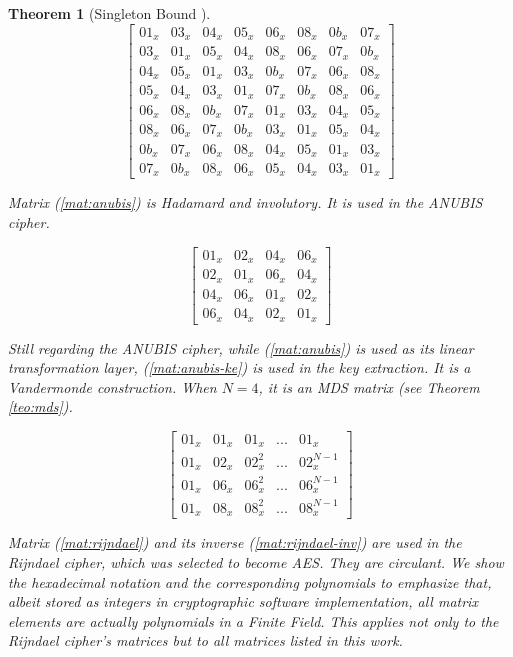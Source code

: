 \documentclass{report}
\newtheorem{theorem}{Theorem}{\bfseries}{\itshape}
\begin{document}
\begin{theorem}[Singleton Bound \cite{SloaneBook}]
\begin{equation}\label{mat:khazad}
\begin{bmatrix}
01_x & 03_x & 04_x & 05_x & 06_x & 08_x & 0b_x & 07_x\\
03_x & 01_x & 05_x & 04_x & 08_x & 06_x & 07_x & 0b_x\\
04_x & 05_x & 01_x & 03_x & 0b_x & 07_x & 06_x & 08_x\\
05_x & 04_x & 03_x & 01_x & 07_x & 0b_x & 08_x & 06_x\\
06_x & 08_x & 0b_x & 07_x & 01_x & 03_x & 04_x & 05_x\\
08_x & 06_x & 07_x & 0b_x & 03_x & 01_x & 05_x & 04_x\\
0b_x & 07_x & 06_x & 08_x & 04_x & 05_x & 01_x & 03_x\\
07_x & 0b_x & 08_x & 06_x & 05_x & 04_x & 03_x & 01_x
\end{bmatrix}
\end{equation}

Matrix (\ref{mat:anubis}) is Hadamard and involutory. It is used in the ANUBIS \cite{ANUBIS2000} cipher.

\begin{equation}\label{mat:anubis}
\begin{bmatrix}
01_x & 02_x & 04_x & 06_x\\
02_x & 01_x & 06_x & 04_x\\
04_x & 06_x & 01_x & 02_x\\
06_x & 04_x & 02_x & 01_x
\end{bmatrix}
\end{equation}

Still regarding the ANUBIS cipher, while (\ref{mat:anubis}) is used as its linear transformation layer, (\ref{mat:anubis-ke}) is used in the key extraction. It is a Vandermonde construction. When $N = 4$, it is an MDS matrix (see Theorem \ref{teo:mds}).

\begin{equation}\label{mat:anubis-ke}
\begin{bmatrix}
01_x & 01_x & 01_x & ... & 01_x\\
01_x & 02_x & 02_x^2 & ... & 02_x^{N-1}\\
01_x & 06_x & 06_x^2 & ... & 06_x^{N-1}\\
01_x & 08_x & 08_x^2 & ... & 08_x^{N-1}
\end{bmatrix}
\end{equation}

Matrix (\ref{mat:rijndael}) and its inverse (\ref{mat:rijndael-inv}) are used in the Rijndael \cite{DesignOfRijndael2002} cipher, which was selected to become AES. They are circulant. We show the hexadecimal notation and the corresponding polynomials to emphasize that, albeit stored as integers in cryptographic software implementation, all matrix elements are actually polynomials in a Finite Field. This applies not only to the Rijndael cipher's matrices but to all matrices listed in this work.


\end{theorem}
\end{document}
